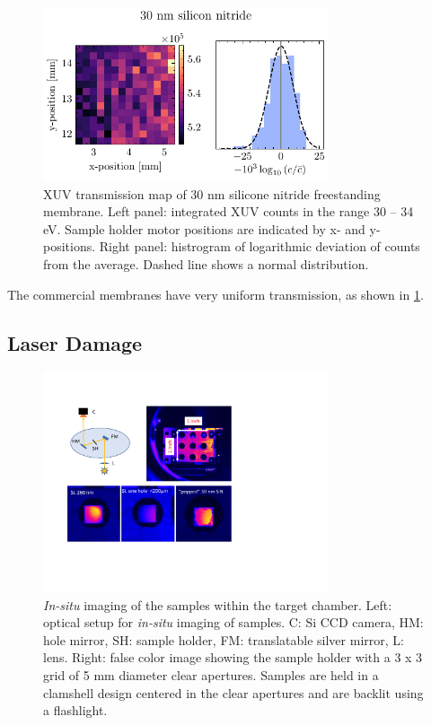 \begin{figure}
	\centering
	\includegraphics[width=0.75\textwidth]{figures/chap4/nitride_map.pdf}
	\caption{XUV transmission map of 30 nm silicone nitride freestanding membrane. Left panel: integrated XUV counts in the range 30 -- 34 eV. Sample holder motor positions are indicated by x- and y-positions. Right panel: histrogram of logarithmic deviation of counts from the average. Dashed line shows a normal distribution.}
	\label{fig:nitride_map}
\end{figure}

The commercial membranes have very uniform transmission, as shown in \cref{fig:nitride_map}.

\subsection{Laser Damage}

\begin{figure}
	\centering
	\includegraphics[width=0.75\textwidth]{figures/chap4/sample_holder_damage.pdf}
	\caption{\textit{In-situ} imaging of the samples within the target chamber. Left: optical setup for \textit{in-situ} imaging of samples. C: Si CCD camera, HM: hole mirror, SH: sample holder, FM: translatable silver mirror, L: lens. Right: false color image showing the sample holder with a 3 x 3 grid of 5 mm diameter clear apertures. Samples are held in a clamshell design centered in the clear apertures and are backlit using a flashlight.}
	\label{fig:sample_holder_damage}
\end{figure}

